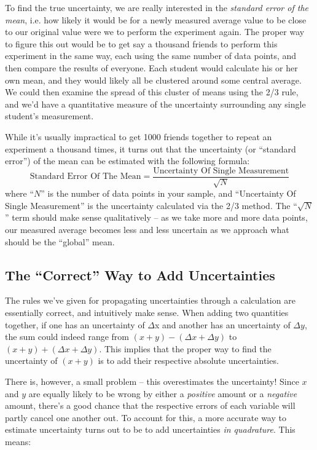 \documentclass{article}
\begin{document}
To find the true uncertainty, we are really interested in the \emph{standard error of the mean}, i.e. how likely it would be for a newly measured average value to be close to our original value were we to perform the experiment again.  The proper way to figure this out would be to get say a thousand friends to perform this experiment in the same way, each using the same number of data points, and then compare the results of everyone.  Each student would calculate his or her own mean, and they would likely all be clustered around some central average.  We could then examine the spread of this cluster of means using the 2/3 rule, and we'd have a quantitative measure of the uncertainty surrounding any single student's measurement.\myskip

While it's usually impractical to get 1000 friends together to repeat an experiment a thousand times, it turns out that the uncertainty (or ``standard error'') of the mean can be estimated with the following formula:
\begin{equation}
    \text{Standard Error Of The Mean} = \frac{\text{Uncertainty Of Single Measurement}}{\sqrt{N}}
\end{equation}
where ``$N$'' is the number of data points in your sample, and ``Uncertainty Of Single Measurement'' is the uncertainty calculated via the 2/3 method.  The ``$\sqrt{N}$'' term should make sense qualitatively -- as we take more and more data points, our measured average becomes less and less uncertain as we approach what should be the ``global'' mean.

\subsection{The ``Correct'' Way to Add Uncertainties}

The rules we've given for propagating uncertainties through a calculation are essentially correct, and intuitively make sense.  When adding two quantities together, if one has an uncertainty of $\Delta$x and another has an uncertainty of $\Delta y$, the sum could indeed range from $(x+y) - (\Delta x +  \Delta y)$ to $(x+y) + (\Delta x + \Delta y)$.  This implies that the proper way to find the uncertainty of $(x+y)$ is to add their respective absolute uncertainties. \myskip

There is, however, a small problem -- this overestimates the uncertainty!  Since $x$ and $y$ are equally likely to be wrong by either a \emph{positive} amount or a \emph{negative} amount, there's a good chance that the respective errors of each variable will partly cancel one another out.  To account for this, a more accurate way to estimate uncertainty turns out to be to add uncertainties \emph{in quadrature}.  This means:\myskip
\end{document}
